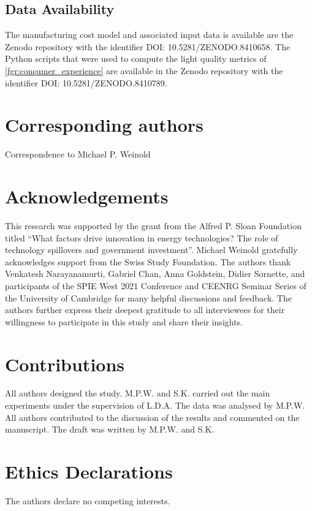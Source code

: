 \documentclass[parskip=full]{article}
\begin{document}
\subsection{Data Availability}

The manufacturing cost model and associated input data is available are the Zenodo repository with the identifier DOI: 10.5281/ZENODO.8410658. The Python scripts that were used to compute the light quality metrics of \cref{fgr:consumer_experience} are available in the Zenodo repository with the identifier DOI: 10.5281/ZENODO.8410789.

\section*{Corresponding authors}
Correspondence to Michael P. Weinold

\section*{Acknowledgements}

This research was supported by the grant from the Alfred P. Sloan Foundation titled “What factors drive innovation in energy technologies? The role of technology spillovers and government investment”. Michael Weinold gratefully acknowledges support from the Swiss Study Foundation. The authors thank Venkatesh Narayanamurti, Gabriel Chan, Anna Goldstein, Didier Sornette, and participants of the SPIE West 2021 Conference and CEENRG Seminar Series of the University of Cambridge for many helpful discussions and feedback. The authors further express their deepest gratitude to all interviewees for their willingness to participate in this study and share their insights.

\section*{Contributions}
All authors designed the study. M.P.W. and S.K. carried out the main experiments under the supervision of L.D.A. The data was analysed by M.P.W. All authors contributed to the discussion of the results and commented on the manuscript. The draft was written by M.P.W. and S.K.

\section*{Ethics Declarations}
The authors declare no competing interests.

\newpage
\printbibliography
\end{document}

